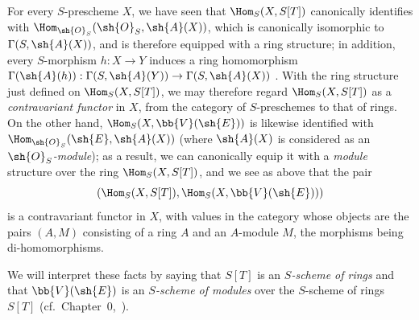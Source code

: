 \begin{env}[1.7.13]
\label{II.1.7.13}
For every $S$-prescheme $X$, we have seen  that $\Hom_S(X,S[T])$ canonically identifies with $\Hom_{\sh{O}_S}(\sh{O}_S,\sh{A}(X))$, which is canonically isomorphic to $\Gamma(S,\sh{A}(X))$, and is therefore equipped with a ring structure; in addition, every $S$-morphism $h:X\to Y$ induces a ring homomorphism $\Gamma(\sh{A}(h)):\Gamma(S,\sh{A}(Y))\to\Gamma(S,\sh{A}(X))$ .
With the ring structure just defined on $\Hom_S(X,S[T])$, we may therefore regard $\Hom_S(X,S[T])$ as a \emph{contravariant functor} in $X$, from the category of $S$-preschemes to that of rings.
On the other hand, $\Hom_S(X,\bb{V}(\sh{E}))$ is likewise identified with $\Hom_{\sh{O}_S}(\sh{E},\sh{A}(X))$ (where $\sh{A}(X)$ is considered as an \emph{$\sh{O}_S$-module});
as a result, we can canonically equip it with a \emph{module} structure over the ring $\Hom_S(X,S[T])$, and we see as above that the pair
\[
  (\Hom_S(X,S[T]),\Hom_S(X,\bb{V}(\sh{E})))
\]
is a contravariant functor in $X$, with values in the category whose objects are the pairs $(A,M)$ consisting of a ring $A$ and an $A$-module $M$, the morphisms being di-homomorphisms.

We will interpret these facts by saying that $S[T]$ is an \emph{$S$-scheme of rings} and that $\bb{V}(\sh{E})$ is an \emph{$S$-scheme of modules} over the $S$-scheme of rings $S[T]$ (cf.~Chapter~0,~).
\end{env}

